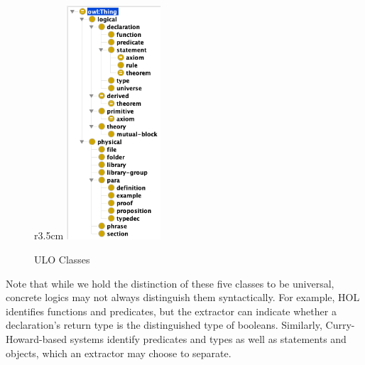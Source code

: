\begin{figure}r{3.5cm}\vspace*{-2em}
  \includegraphics[width=3.5cm]{classes}\vspace*{.5em}
  \caption{ULO Classes}\label{fig:classes}\vspace*{-3em}
\end{figure}
Note that while we hold the distinction of these five classes to be universal, concrete logics may not always distinguish them syntactically.
For example, HOL identifies functions and predicates, but the extractor can indicate whether a declaration's return type is the distinguished type of booleans.
Similarly, Curry-Howard-based systems identify predicates and types as well as statements and objects, which an extractor may choose to separate.




